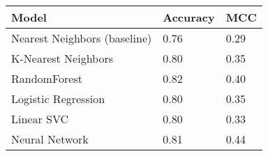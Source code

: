 \begin{tabular}{lll}
\toprule
\textbf{Model}      & \textbf{Accuracy} & \textbf{MCC}  \\
\midrule
Nearest Neighbors (baseline)   & 0.76              & 0.29          \\     
K-Nearest Neighbors & 0.80              & 0.35          \\
RandomForest        & 0.82              & 0.40          \\
Logistic Regression & 0.80              & 0.35          \\
Linear SVC          & 0.80              & 0.33          \\
Neural Network      & 0.81              & 0.44          \\
\bottomrule
\end{tabular}
